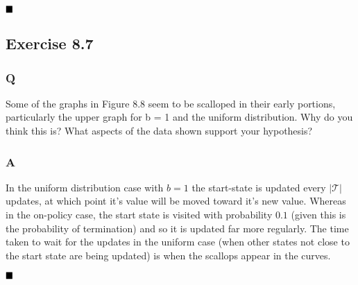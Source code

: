 $
\hfill \blacksquare
$

\subsection{Exercise 8.7}
\subsubsection{Q}
Some of the graphs in Figure 8.8 seem to be scalloped in their early portions, particularly the upper graph for b = 1 and the uniform distribution. Why do you think this is? What aspects of the data shown support your hypothesis?
\subsubsection{A}
In the uniform distribution case with $b=1$ the start-state is updated every $|\mathcal{T}|$ updates, at which point it's value will be moved toward it's new value.  Whereas in the on-policy case, the start state is visited with probability $0.1$ (given this is the probability of termination)  and so it is updated far more regularly. The time taken to wait for the updates in the uniform case (when other states not close to the start state are being updated) is when the scallops appear in the curves. 

$
\hfill \blacksquare
$